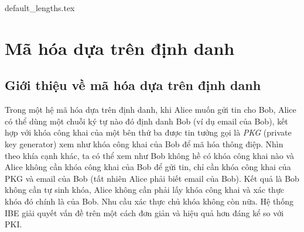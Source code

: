 \documentclass[class=report, crop=false]{standalone}
\begin{document}
	{default_lengths.tex}
	\baselineskip
	\chapter{Mã hóa dựa trên định danh}\label{chap:2}
	\section{Giới thiệu về mã hóa dựa trên định danh}
		Trong một hệ mã hóa dựa trên định danh, khi Alice muốn gửi tin cho Bob, Alice có thể dùng một chuỗi ký tự nào đó định danh Bob (ví dụ email của Bob), kết hợp với khóa công khai của một bên thứ ba được tin tưởng gọi là \textit{PKG} (private key generator) xem như khóa công khai của Bob để mã hóa thông điệp. Nhìn theo khía cạnh khác, ta có thể xem như Bob không hề có khóa công khai nào và Alice không cần khóa công khai của Bob để gửi tin, chỉ cần khóa công khai của PKG và email của Bob (tất nhiên Alice phải biết email của Bob). Kết quả là Bob không cần tự sinh khóa, Alice không cần phải lấy khóa công khai và xác thực khóa đó chính là của Bob. Nhu cầu xác thực chủ khóa không còn nữa. Hệ thống IBE giải quyết vấn đề trên một cách đơn giản và hiệu quả hơn đáng kể so với PKI.
\end{document}
